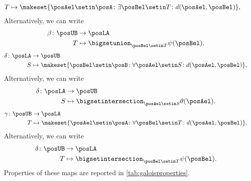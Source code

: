 {\begin{equation}
\begin{aligned}
            T                  & \mapsto \makeset{\posAel\setin \posA  \colon \exists \posBel\setin T\colon d(\posAel,\posBel)},
        \end{aligned}
    \end{equation}
    \noindent Alternatively, we can write
    \begin{equation}
        \begin{aligned}
            \beta \colon \posUB & \to \posLA \\
            T                   & \mapsto \bigsetunion_{\posBel\setin T} \psi(\posBel).
        \end{aligned}
    \end{equation}
    \begin{equation}
        \label{eq:galoisdelta}
        \begin{aligned}
            \delta \colon \posLA & \to \posUB \\
            S                    & \mapsto \makeset{\posBel\setin \posB \colon \forall {\posAel\setin S}\colon d(\posAel,\posBel)},
        \end{aligned}
    \end{equation}
    Alternatively, we can write
    \begin{equation}
        \begin{aligned}
            \delta\colon \posLA & \to \posUB \\
            S                   & \mapsto \bigsetintersection_{\posAel\setin S}\theta(\posAel).
        \end{aligned}
    \end{equation}
    \begin{equation}
        \label{eq:galoisgamma}
        \begin{aligned}
            \gamma \colon \posUB & \to \posLA \\
            T                    & \mapsto \makeset{\posAel\setin \posA \colon \forall {\posBel\setin T}\colon d(\posAel,\posBel)},
        \end{aligned}
    \end{equation}
    Alternatively, we can write
    \begin{equation}
        \begin{aligned}
            \delta\colon \posUB & \to \posLA \\
            T                   & \mapsto \bigsetintersection_{\posBel\setin T}\psi(\posBel).
        \end{aligned}
    \end{equation}
    Properties of these maps are reported in \cref{tab:galoisproperties}.

}
